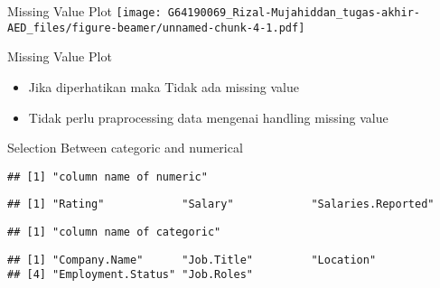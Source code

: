 \documentclass[
  ignorenonframetext,
]{beamer}
\providecommand{\tightlist}{%
  \setlength{\itemsep}{0pt}\setlength{\parskip}{0pt}}
\begin{document}
\begin{frame}{Missing Value Plot}
\protect\hypertarget{missing-value-plot}{}
\texttt{[image: G64190069\_Rizal-Mujahiddan\_tugas-akhir-AED\_files/figure-beamer/unnamed-chunk-4-1.pdf]}
\end{frame}

\begin{frame}{Missing Value Plot}
\protect\hypertarget{missing-value-plot-1}{}
\begin{itemize}
\tightlist
\item
  Jika diperhatikan maka Tidak ada missing value
\item
  Tidak perlu praprocessing data mengenai handling missing value
\end{itemize}
\end{frame}

\begin{frame}[fragile]{Selection Between categoric and numerical}
\protect\hypertarget{selection-between-categoric-and-numerical}{}
\begin{verbatim}
## [1] "column name of numeric"
\end{verbatim}

\begin{verbatim}
## [1] "Rating"            "Salary"            "Salaries.Reported"
\end{verbatim}

\begin{verbatim}
## [1] "column name of categoric"
\end{verbatim}

\begin{verbatim}
## [1] "Company.Name"      "Job.Title"         "Location"         
## [4] "Employment.Status" "Job.Roles"
\end{verbatim}
\end{frame}
\end{document}
